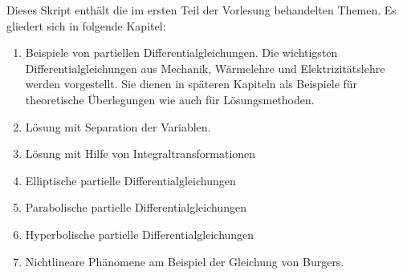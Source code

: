 Dieses Skript enthält die im ersten Teil der Vorlesung behandelten 
Themen. Es gliedert sich in folgende Kapitel:
\begin{enumerate}
\item Beispiele von partiellen Differentialgleichungen. Die wichtigsten
Differentialgleichungen aus Mechanik, Wärmelehre und Elektrizitätslehre
werden vorgestellt. Sie dienen in späteren Kapiteln als Beispiele
für theoretische Überlegungen wie auch für Lösungsmethoden.
\item Lösung mit Separation der Variablen.
\item Lösung mit Hilfe von Integraltransformationen
\item Elliptische partielle Differentialgleichungen
\item Parabolische partielle Differentialgleichungen
\item Hyperbolische partielle Differentialgleichungen
\item Nichtlineare Phänomene am Beispiel der Gleichung von Burgers.
\end{enumerate}


